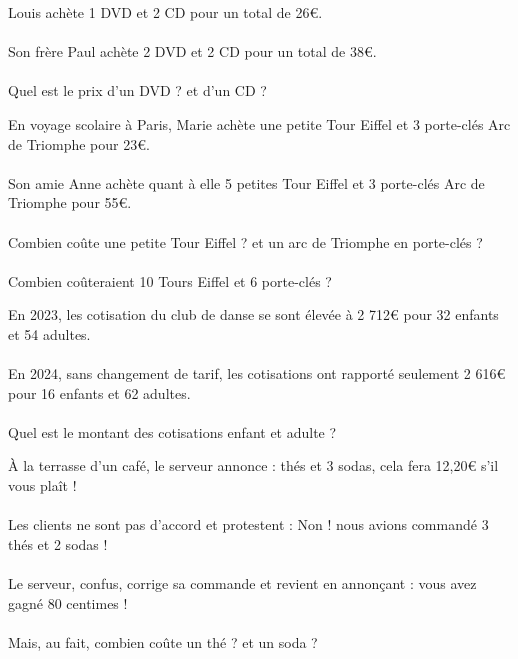 

\AdvanceDate[0]


\pagestyle{fancy}
\fancyhead[R]{\today}


\centering
\hfill
\parbox{.3\textwidth}{
	\begin{exercice}{}{}
		Louis achète 1 DVD et 2 CD pour un total de 26€.
		\\\\
		Son frère Paul achète 2 DVD et 2 CD pour un total de 38€.
		\\\\
		Quel est le prix d'un DVD ? et d'un CD ?
	\end{exercice}	
}
\hfill
\parbox{.5\textwidth}{
	\begin{exercice}{}{}
		En voyage scolaire à Paris, Marie achète une petite Tour Eiffel et 3 porte-clés Arc de Triomphe pour 23€.
		\\\\
		Son amie Anne achète quant à elle 5 petites Tour Eiffel et 3 porte-clés Arc de Triomphe pour 55€.
		\\\\
		Combien coûte une petite Tour Eiffel ?
		et un arc de Triomphe en porte-clés ?
		\\\\
		Combien coûteraient 10 Tours Eiffel et 6 porte-clés ?
	\end{exercice}	
}
	
\parbox{.7\textwidth}{
	\begin{exercice}{}{}
		En 2023, les cotisation du club de danse se sont élevée à 2 712€ pour 32 enfants et 54 adultes.
		\\\\
		En 2024, sans changement de tarif, les cotisations ont rapporté seulement 2 616€ pour 16 enfants et 62 adultes.
		\\\\
		Quel est le montant des cotisations enfant et adulte ?
	\end{exercice}	
}


\parbox{.8\textwidth}{
	\begin{exercice}{}{}
		À la terrasse d'un café, le serveur annonce :  thés et 3 sodas, cela fera 12,20€ s'il vous plaît ! \fg
		\\\\
		Les clients ne sont pas d'accord et protestent : \og Non ! nous avions commandé 3 thés et 2 sodas ! \fg
		\\\\
		Le serveur, confus, corrige sa commande et revient en annonçant : \og vous avez gagné 80 centimes ! \fg
		\\\\
		Mais, au fait, combien coûte un thé ? et un soda ?
	\end{exercice}	
}

